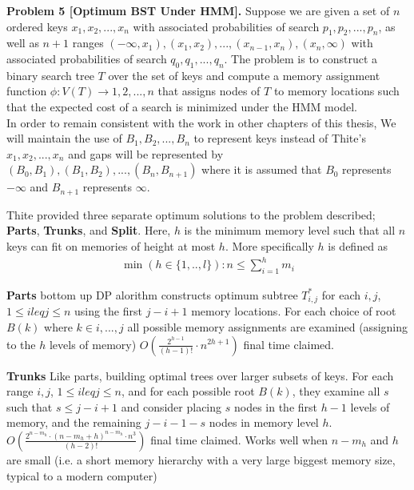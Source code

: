 \documentclass[letterpaper,12pt,titlepage,oneside,final]{book}
\theoremstyle{plain}
\begin{document}
\noindent \textbf{Problem 5 [Optimum BST Under HMM].}  \cite{thite2008optimum} Suppose we are given a set of $n$ ordered keys $x_1, x_2, ..., x_n$ with associated probabilities of search $p_1, p_2, ..., p_n$, as well as $n+1$ ranges $(- \infty, x_1), (x_1, x_2), ..., (x_{n-1}, x_n), (x_n, \infty)$ with associated probabilities of search $q_0, q_1, ..., q_n$. The problem is to construct a binary search tree $T$ over the set of keys and compute a memory assignment function $\phi : V (T) \rightarrow {1, 2, ..., n}$ that assigns nodes of $T$ to memory locations such that the expected cost of a search is minimized under the HMM model. \\

In order to remain consistent with the work in other chapters of this thesis, We will maintain the use of $B_1, B_2, ..., B_n$ to represent keys instead of Thite's $x_1, x_2, ..., x_n$ and gaps will be represented by $(B_0, B_1), (B_1, B_2), ..., (B_n, B_{n+1})$ where it is assumed that $B_0$ represents $- \infty$ and $B_{n+1}$ represents $\infty$.

Thite provided three separate optimum solutions to the problem described; \textbf{Parts}, \textbf{Trunks}, and \textbf{Split}. Here, $h$ is the minimum memory level such that all $n$ keys can fit on memories of height at most $h$. More specifically $h$ is defined as \\
\begin{align*}
\min(h \in \{1,..,l\} ): n \leq \sum_{i = 1}^{h}m_i
\end{align*}

\textbf{Parts}
bottom up DP alorithm
constructs optimum subtree $T^{*}_{i,j}$ for each $i,j$, $1 \leq i leq j \leq n$ using the first $j-i+1$ memory locations.
For each choice of root $B(k)$ where $k \in {i, ..., j}$ all possible memory assignments are examined (assigning to the $h$ levels of memory)
$O(\frac{2^{h-1}}{(h-1)!}\cdot n^{2h+1})$ final time claimed.

\textbf{Trunks}
Like parts, building optimal trees over larger subsets of keys.
For each range $i,j$, $1 \leq i leq j \leq n$, and for each possible root $B(k)$, they examine all $s$ such that $s \leq j-i+1$ and consider placing $s$ nodes in the first $h-1$ levels of memory, and the remaining $j-i-1-s$ nodes in memory level $h$.
$O(\frac{2^{n-m_h}\cdot (n-m_h+h)^{n-m_h}\cdot n^3}{(h-2)!})$ final time claimed. Works well when $n-m_h$ and $h$ are small (i.e. a short memory hierarchy with a very large biggest memory size, typical to a modern computer)
\end{document}
